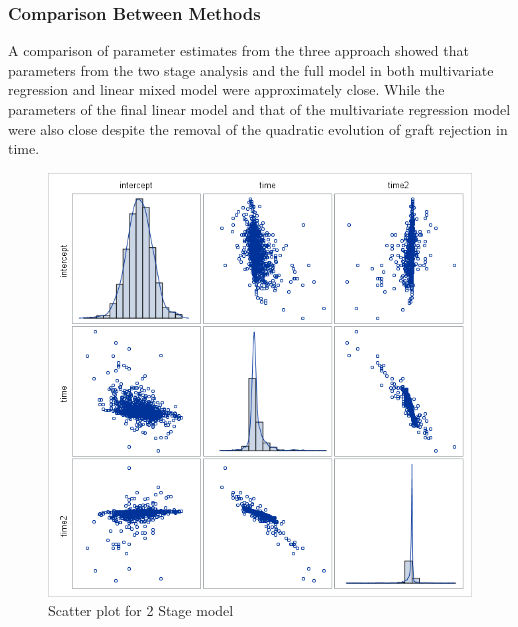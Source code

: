 \documentclass[11pt]{article}
\begin{document}
\subsubsection{Comparison Between Methods}
A comparison of parameter estimates from the three approach showed that parameters from the two stage analysis and the full model in both multivariate regression and linear mixed model were approximately close. While the parameters of the final linear model and that of the multivariate regression model were also close despite the removal of the quadratic evolution of graft rejection in time.
\begin{figure}[H]
	\centering
	\begin{minipage}{.4\textwidth}
		\includegraphics[scale=0.38]{SGScatter2Stage-model.png}
		\caption{Scatter plot for 2 Stage model}
	\end{minipage}
	\begin{minipage}{.4\textwidth}

\end{minipage}
\end{figure}
\end{document}
